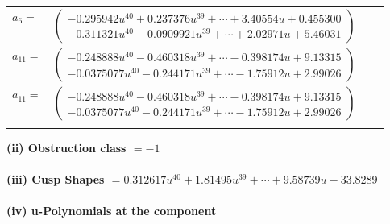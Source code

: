 \documentclass[1p]{elsarticle_modified}
\theoremstyle{definition}
\begin{document}
\begin{tabular}{m{7pt} m{180pt} m{7pt} m{180pt} }
\flushright $a_{6}=$&$\begin{pmatrix}-0.295942 u^{40}+0.237376 u^{39}+\cdots+3.40554 u+0.455300\\-0.311321 u^{40}-0.0909921 u^{39}+\cdots+2.02971 u+5.46031\end{pmatrix}$ \\
\flushright $a_{11}=$&$\begin{pmatrix}-0.248888 u^{40}-0.460318 u^{39}+\cdots-0.398174 u+9.13315\\-0.0375077 u^{40}-0.244171 u^{39}+\cdots-1.75912 u+2.99026\end{pmatrix}$\\ \flushright $a_{11}=$&$\begin{pmatrix}-0.248888 u^{40}-0.460318 u^{39}+\cdots-0.398174 u+9.13315\\-0.0375077 u^{40}-0.244171 u^{39}+\cdots-1.75912 u+2.99026\end{pmatrix}$\\&\end{tabular}
\flushleft \textbf{(ii) Obstruction class $= -1$}\\~\\
\flushleft \textbf{(iii) Cusp Shapes $= 0.312617 u^{40}+1.81495 u^{39}+\cdots+9.58739 u-33.8289$}\\~\\
\newpage\renewcommand{\arraystretch}{1}
\flushleft \textbf{(iv) u-Polynomials at the component}\newline \\
\end{document}
